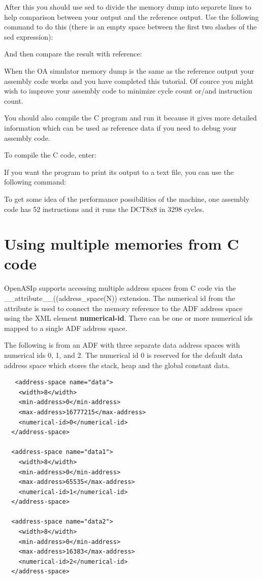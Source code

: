 \documentclass[a4paper,twoside]{tceusermanual}
\begin{document}
After this you should use sed to divide the memory dump into separete lines
to help comparison between your output and the reference output. Use the
following command to do this (there is an empty space between the
first two slashes of the sed expression):


And then compare the result with reference:


When the OA simulator memory dump is the same as the reference output your
assembly code works and you have completed this tutorial. Of
cource you might wish to improve your assembly code to minimize cycle
count or/and instruction count.

You should also compile the C program and run it because it gives more
detailed information which can be used as reference data if you need to debug
your assembly code.

To compile the C code, enter:


If you want the program to print its output to a text file, you can use the
following command:



To get some idea of the performance possibilities of the machine,
one assembly code has 52 instructions and it runs the DCT8x8 in
3298 cycles.

\section{Using multiple memories from C code}

OpenASIp supports accessing multiple address spaces from C code via the
\_\_attribute\_\_((address\_space(N)) extension. The numerical id from
the attribute is used to connect the memory reference to the ADF 
address space using the XML element \textbf{numerical-id}. There can be
one or more numerical ids mapped to a single ADF address space.

The following is from an ADF with three separate data address spaces with
numerical ids 0, 1, and 2. The numerical id 0 is reserved for the default 
data address space which stores the stack, heap and the global constant 
data.

\begin{verbatim}
   <address-space name="data">
    <width>8</width>
    <min-address>0</min-address>
    <max-address>16777215</max-address>
    <numerical-id>0</numerical-id>
  </address-space>

  <address-space name="data1">
    <width>8</width>
    <min-address>0</min-address>
    <max-address>65535</max-address>
    <numerical-id>1</numerical-id>
  </address-space>

  <address-space name="data2">
    <width>8</width>
    <min-address>0</min-address>
    <max-address>16383</max-address>
    <numerical-id>2</numerical-id>
  </address-space>
\end{verbatim}
\end{document}
